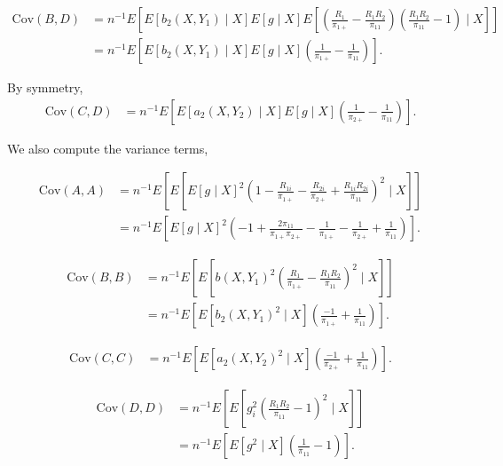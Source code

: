 \documentclass[12pt]{article}
\newcommand{\Cov}{{\text{Cov}}}
\begin{document}
\begin{itemize}
    \begin{align*}
      \Cov(B, D) &= n^{-1} E\left[ E[b_2(X, Y_1) \mid X] E[g \mid X]
      E\left[\left(\frac{R_1}{\pi_{1+}} - \frac{R_1 R_2}{\pi_{11}}\right)
      \left(\frac{R_1 R_2}{\pi_{11}} - 1\right) \mid X\right] \right]\\
      &= n^{-1} E\left[ E[b_2(X, Y_1) \mid X] E[g \mid X]
      \left(\frac{1}{\pi_{1+}} - \frac{1}{\pi_{11}}\right)\right].
    \end{align*}

    By symmetry,
    \begin{align*}
      \Cov(C, D) 
      &= n^{-1} E\left[ E[a_2(X, Y_2) \mid X] E[g \mid X]
      \left(\frac{1}{\pi_{2+}} - \frac{1}{\pi_{11}}\right)\right].
    \end{align*}

    We also compute the variance terms,

    \begin{align*}
      \Cov(A, A) &= n^{-1} E\left[ E\left[ E[g \mid X]^2 \left(1
      - \frac{R_{1i}}{\pi_{1+}} - \frac{R_{2i}}{\pi_{2+}} +
      \frac{R_{1i}R_{2i}}{\pi_{11}}\right)^2 \mid X\right] \right]\\
      &= n^{-1} E \left[ E[g \mid X]^2 \left(-1 + \frac{2 \pi_{11}}{\pi_{1+}
      \pi_{2+}} - \frac{1}{\pi_{1+}} - \frac{1}{\pi_{2+}} +
      \frac{1}{\pi_{11}}\right)\right].
    \end{align*}

    \begin{align*}
      \Cov(B, B) &= n^{-1} E\left[ E\left[b(X, Y_1)^2 \left(\frac{R_1}{\pi_{1+}}
      - \frac{R_1 R_2}{\pi_{11}}\right)^2 \mid X\right] \right]\\
      &= n^{-1} E\left[ E[b_2(X, Y_1)^2 \mid X] \left(\frac{-1}{\pi_{1+}} +
      \frac{1}{\pi_{11}}\right)\right].
    \end{align*}
    
    \begin{align*}
      \Cov(C, C) &= n^{-1} E\left[ E[a_2(X, Y_2)^2 \mid X]
      \left(\frac{-1}{\pi_{2+}} + \frac{1}{\pi_{11}}\right) \right].
    \end{align*}

    \begin{align*}
      \Cov(D, D) &= n^{-1} E\left[ E\left[g_i^2 \left(\frac{R_1 R_2}{\pi_{11}} -
      1\right)^2 \mid X\right] \right]\\
      &= n^{-1} E\left[ E[g^2 \mid X] \left(\frac{1}{\pi_{11}} -
      1\right)\right].
    \end{align*}


\end{itemize}
\end{document}

